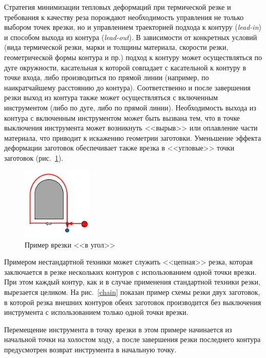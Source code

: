 \documentclass[11pt,twoside,openany]{report}
\newcounter{cor}
\begin{document}
Стратегия минимизации тепловых деформаций при термической резке
и требования к качеству реза порождают необходимость управления
не только выбором точек врезки,
но и управлением траекторией подхода к контуру
(\textit{lead-in})
и способом выхода из контура
(\textit{lead-out}).
В зависимости от конкретных условий
(вида термической резки, марки и толщины материала,
скорости резки, геометрической формы контура и пр.)
подход к контуру может осуществляться по дуге окружности,
касательная к которой совпадает с касательной к контуру в точке входа,
либо производиться по прямой линии
(например, по наикратчайшему расстоянию до контура).
Соответственно и после завершения резки выход из контура
также может осуществляться с включенным инструментом
(либо по дуге, либо по прямой линии).
Необходимость выхода из контура с включенным
инструментом может быть вызвана тем,
что в точке выключения инструмента может возникнуть
<<вырыв>> или оплавление части материала,
что приводит к искажению геометрии заготовки.
Уменьшение эффекта деформации заготовок обеспечивает
также врезка в <<угловые>> точки заготовок
(рис.~\ref{corner}).

\begin{figure}[h]
  \begin{center}
  \includegraphics[width=0.3\textwidth]{corner.png}
  \caption{Пример врезки <<в угол>>}
  \label{corner}
  \end{center}
\end{figure}

Примером нестандартной техники
может служить <<цепная>> резка,
которая заключается в резке нескольких контуров с
использованием одной точки врезки.
При этом каждый контур,
как и в случае применения стандартной техники резки,
вырезается целиком.
На рис.~\ref{chain}
показан пример схемы резки двух заготовок,
в которой резка внешних контуров обеих заготовок
производится без выключения инструмента
с использованием только одной точки врезки.

Перемещение инструмента в точку врезки
в этом примере начинается из начальной точки на холостом ходу,
а после завершения резки последнего контура
предусмотрен возврат инструмента в начальную точку.
\end{document}
